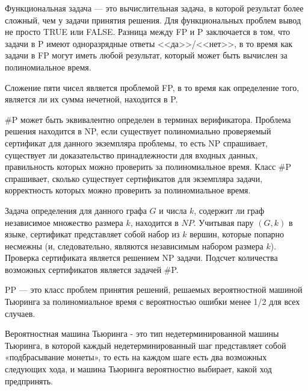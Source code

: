     

    \begin{Def}
        Функциональная задача --- это вычислительная задача, в которой результат более сложный, чем у задачи принятия решения. Для функциональных проблем вывод не просто TRUE или FALSE. Разница между FP и P заключается в том, что задачи в P имеют одноразрядные ответы <<да>>/<<нет>>, в то время как задачи в FP могут иметь любой результат, который может быть вычислен за полиномиальное время. 
    \end{Def}
    \begin{Example}
        Сложение пяти чисел является проблемой FP, в то время как определение того, является ли их сумма нечетной, находится в P. 
    \end{Example}
    \begin{Def}
        \#P может быть эквивалентно определен в терминах верификатора. Проблема решения находится в NP, если существует полиномиально проверяемый сертификат для данного экземпляра проблемы, то есть NP спрашивает, существует ли доказательство принадлежности для входных данных, правильность которых можно проверить за полиномиальное время. Класс \#P спрашивает, сколько существует сертификатов для экземпляра задачи, корректность которых можно проверить за полиномиальное время. 
    \end{Def}
    \begin{Example}
        Задача определения для данного графа $G$ и числа $k$, содержит ли граф независимое множество размера $k$, находится в $NP$. Учитывая пару $(G, k)$ в языке, сертификат представляет собой набор из $k$ вершин, которые попарно несмежны (и, следовательно, являются независимым набором размера $k$). Проверка сертификата является решением NP задачи. Подсчет количества возможных сертификатов является задачей \#P.
    \end{Example}
    \begin{Def}[Класс PP]
        PP — это класс проблем принятия решений, решаемых вероятностной машиной Тьюринга за полиномиальное время с вероятностью ошибки менее 1/2 для всех случаев. 
    \end{Def}
    \begin{Def}
        Вероятностная машина Тьюринга - это тип недетерминированной машины Тьюринга, в которой каждый недетерминированный шаг представляет собой «подбрасывание монеты», то есть на каждом шаге есть два возможных следующих хода, и машина Тьюринга вероятностно выбирает, какой ход предпринять. 
    \end{Def}

